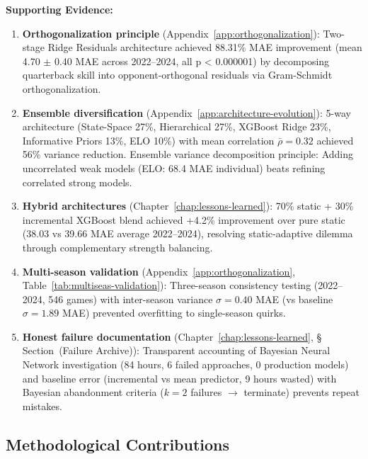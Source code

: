 \textbf{Supporting Evidence:}
\begin{enumerate}[itemsep=2pt,parsep=0pt]
    \item \textbf{Orthogonalization principle} (Appendix~\ref{app:orthogonalization}): Two-stage Ridge Residuals architecture achieved 88.31\% MAE improvement (mean 4.70 $\pm$ 0.40 MAE across 2022--2024, all p < 0.000001) by decomposing quarterback skill into opponent-orthogonal residuals via Gram-Schmidt orthogonalization.

    \item \textbf{Ensemble diversification} (Appendix~\ref{app:architecture-evolution}): 5-way architecture (State-Space 27\%, Hierarchical 27\%, XGBoost Ridge 23\%, Informative Priors 13\%, ELO 10\%) with mean correlation $\bar{\rho} = 0.32$ achieved 56\% variance reduction. Ensemble variance decomposition principle: Adding uncorrelated weak models (ELO: 68.4 MAE individual) beats refining correlated strong models.

    \item \textbf{Hybrid architectures} (Chapter~\ref{chap:lessons-learned}): 70\% static + 30\% incremental XGBoost blend achieved +4.2\% improvement over pure static (38.03 vs 39.66 MAE average 2022--2024), resolving static-adaptive dilemma through complementary strength balancing.

    \item \textbf{Multi-season validation} (Appendix~\ref{app:orthogonalization}, Table~\ref{tab:multiseas-validation}): Three-season consistency testing (2022--2024, 546 games) with inter-season variance $\sigma = 0.40$ MAE (vs baseline $\sigma = 1.89$ MAE) prevented overfitting to single-season quirks.

    \item \textbf{Honest failure documentation} (Chapter~\ref{chap:lessons-learned}, \S%
Section~(Failure Archive)): Transparent accounting of Bayesian Neural Network investigation (84 hours, 6 failed approaches, 0 production models) and baseline error (incremental vs mean predictor, 9 hours wasted) with Bayesian abandonment criteria ($k = 2$ failures $\to$ terminate) prevents repeat mistakes.
\end{enumerate}

\subsection{Methodological Contributions}

